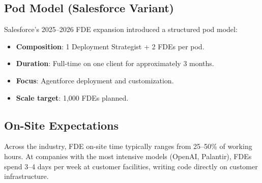 \subsection{Pod Model (Salesforce Variant)}

Salesforce's 2025--2026 FDE expansion introduced a structured pod model:

\begin{itemize}
    \item \textbf{Composition}: 1 Deployment Strategist + 2 FDEs per pod.
    \item \textbf{Duration}: Full-time on one client for approximately
        3 months.
    \item \textbf{Focus}: Agentforce deployment and customization.
    \item \textbf{Scale target}: 1,000 FDEs planned.
\end{itemize}

\subsection{On-Site Expectations}

Across the industry, FDE on-site time typically ranges from 25--50\% of
working hours. At companies with the most intensive models (OpenAI,
Palantir), FDEs spend 3--4 days per week at customer facilities, writing
code directly on customer infrastructure.

